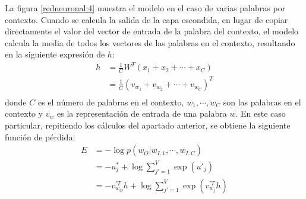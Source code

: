La figura \ref{redneuronal:4} muestra el modelo en el caso de varias palabras por contexto. Cuando se calcula la salida de la capa
escondida, en lugar de copiar directamente el valor del vector de entrada de la palabra del contexto, el modelo calcula la media
de todos los vectores de las palabras en el contexto, resultando en la siguiente expresión de $h$:
\begin{equation}
  \begin{split}
     h & = \frac{1}{C} W^T \left( x_1 + x_2 + \cdots + x_C \right)\\
       & = \frac{1}{C} \left( v_{w_1} + v_{w_2} + \cdots + v_{w_C} \right)^T\\
    \end{split}
\end{equation}
donde $C$ es el número de palabras en el contexto, $w_1, \cdots, w_C$ son las palabras en el contexto y $v_w$ es la representación de entrada
de una palabra $w$. En este caso particular, repitiendo los cálculos del apartado anterior, se obtiene la siguiente función de pérdida:
\begin{equation}
  \begin{split}
    E & = -\log p\left( w_O | w_{I,1}, \cdots, w_{I, C} \right) \\
      & = -u_j^* + \log\displaystyle\sum_{j'=1}^V\exp\left(u'_j\right) \\
      & = -v_{w_O}^{'T}h + \log\displaystyle\sum_{j'=1}^V\exp\left( v_{w_j}^{'T}h \right) \\
  \end{split}
\end{equation}

